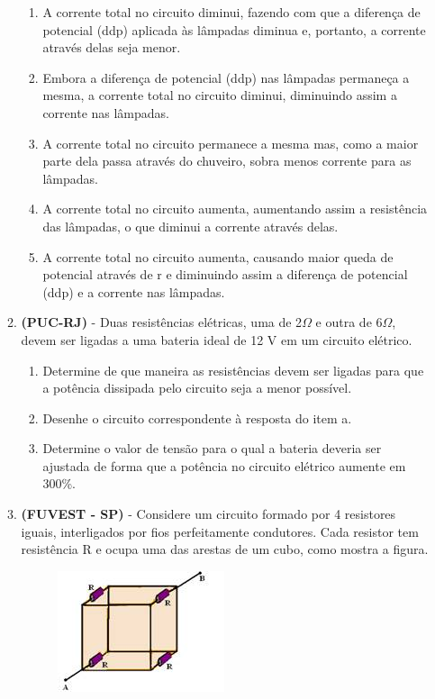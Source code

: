 \documentclass[12pt,letterpaper,fleqn]{article}
\begin{document}
\begin{itemize}
\begin{enumerate}
            \begin{enumerate}
                \item 	A corrente total no circuito diminui, fazendo com que a diferença de potencial (ddp) aplicada às lâmpadas diminua e, portanto, a corrente através delas seja menor.
                \item Embora a diferença de potencial (ddp) nas lâmpadas permaneça a mesma, a corrente total no circuito diminui, diminuindo assim a corrente nas lâmpadas.
                \item A corrente total no circuito permanece a mesma mas, como a maior parte dela passa através do chuveiro, sobra menos corrente para as lâmpadas.
                \item A corrente total no circuito aumenta, aumentando assim a resistência das lâmpadas, o que diminui a corrente através delas.
                \item A corrente total no circuito aumenta, causando maior queda de potencial através de r e diminuindo assim a diferença de potencial (ddp) e a corrente nas lâmpadas.
            \end{enumerate}
            \item \textbf{(PUC-RJ)} - Duas resistências elétricas, uma de 2$\Omega$ e outra de 6$\Omega$, devem ser ligadas a uma bateria ideal de 12 V em um circuito elétrico.
            
            \begin{enumerate}
                \item Determine de que maneira as resistências devem ser ligadas para que a potência dissipada pelo circuito seja a menor possível.
                \item Desenhe o circuito correspondente à resposta do item a. 
                \item Determine o valor de tensão para o qual a bateria deveria ser ajustada de forma que a potência no circuito elétrico aumente em 300\%.
            \end{enumerate}
            \item \textbf{(FUVEST - SP)} - Considere um circuito formado por 4 resistores iguais, interligados por fios perfeitamente condutores. Cada resistor tem resistência R e ocupa uma das arestas de um cubo, como mostra a figura.
            
            \pagebreak
            \begin{figure}[h]
                \centering
                \includegraphics[]{circuito_fuvest_32.jpg}
            \end{figure}
            

\end{enumerate}
\end{itemize}
\end{document}
